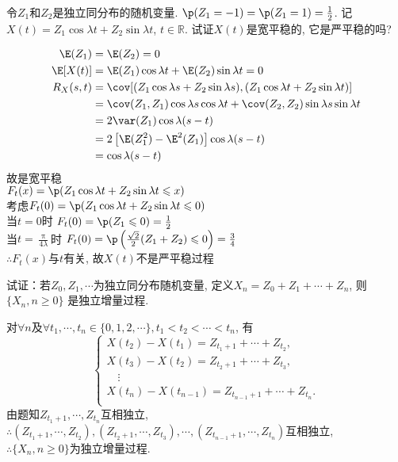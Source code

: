 \begin{problem}{1.6}
令$ Z_1 $和$ Z_2 $是独立同分布的随机变量. $\p(Z_1 = -1) = \p(Z_1 = 1) = \frac{1}{2}$. 记$X(t) = Z_1\cos\lambda t + Z_2\sin\lambda t$, $t \in \mathbb{R}$. 试证$X(t)$是宽平稳的, 它是严平稳的吗?
\end{problem}
\begin{solution}
	\[\begin{aligned}
			\E(Z_1)   & = \E(Z_2) = 0                                                                          \\
			\E[X(t)]  & = \E(Z_1)\cos\lambda t + \E(Z_2)\sin\lambda t = 0                                      \\
			R_X(s, t) & = \cov[(Z_1\cos\lambda s + Z_2\sin\lambda s), (Z_1\cos\lambda t + Z_2\sin\lambda t)]   \\
			          & = \cov(Z_1, Z_1)\cos\lambda s \cos\lambda t + \cov(Z_2, Z_2)\sin\lambda s\sin\lambda t \\
			          & = 2 \var(Z_1)\cos\lambda(s-t)                                                          \\
			          & = 2\left[\E (Z_1^2) - \E ^2(Z_1)\right]\cos\lambda(s-t)                                \\
			          & = \cos\lambda(s-t)
		\end{aligned}\]
	故是宽平稳\\
	$F_t(x) = \p(Z_1\cos\lambda t + Z_2\sin\lambda t \leqslant x)$\\
	考虑$F_t(0) = \p(Z_1\cos\lambda t + Z_2\sin\lambda t \leqslant 0)$\\
	当$t = 0$时 $F_t(0) = \p(Z_1 \leqslant 0) = \frac{1}{2}$\\
	当$t = \frac{\uppi}{4\lambda}$时 $F_t(0) = \p\left(\frac{\sqrt{2}}{2}(Z_1+Z_2) \leqslant 0\right) = \frac{3}{4}$\\
	$\therefore F_t(x)$与$t$有关, 故$X(t)$不是严平稳过程
\end{solution}

\begin{problem}{1.7}
试证：若$Z_0, Z_1,\cdots $为独立同分布随机变量, 定义$ X_n = Z_0 + Z_1 + \cdots + Z_n$, 则$\{X_n, n \geqslant 0\}$ 是独立增量过程.
\end{problem}
\begin{solution}
	对$\forall n$及$\forall t_1, \cdots, t_n\in \{0,1,2,\cdots\}, t_1 < t_2 < \cdots < t_n$, 有
	\[\begin{cases}
			X(t_2) - X(t_1) = Z_{t_1+1}+\cdots+Z_{t_2},         \\
			X(t_3) - X(t_2) = Z_{t_2+1}+\cdots+Z_{t_3},         \\
			\quad \vdots                                        \\
			X(t_n) - X(t_{n-1}) = Z_{t_{n-1}+1}+\cdots+Z_{t_n}. \\
		\end{cases}\]
	由题知$Z_{t_1+1}, \cdots, Z_{t_n}$互相独立,\\
	$\therefore(Z_{t_1+1},\cdots,Z_{t_2}),(Z_{t_2+1},\cdots,Z_{t_3}),\cdots,(Z_{t_{n\!-\!1}\!+\!1},\cdots,Z_{t_n})$互相独立,\\
	$\therefore \{X_n, n \geqslant 0\}$为独立增量过程.
\end{solution}

